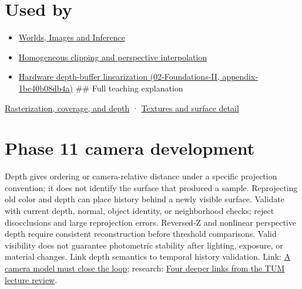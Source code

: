 \section{Used by}\label{appendix-97578ed97952-used-by}

\begin{itemize}
\item
  \href{Continuous\%20Notes/University\%20-\%20Worlds,\%20Images\%20and\%20Inference\%20-\%20Graphics,\%20Vision\%20and\%20Photography}{Worlds, Images and Inference}
\item
  \hyperref[appendix-40426e4b2103]{Homogeneous clipping and perspective interpolation}
\item
  \href{../02-Foundations-II/main.pdf\#nameddest=appendix-1bc40b08db4a}{Hardware depth-buffer linearization (02-Foundations-II, appendix-1bc40b08db4a)} \#\# Full teaching explanation
\end{itemize}

\href{Continuous\%20Notes/University\%20-\%20Worlds,\%20Images\%20and\%20Inference\%20-\%20Graphics,\%20Vision\%20and\%20Photography\#Rasterization,\%20coverage,\%20and\%20depth}{Rasterization, coverage, and depth} · \href{Continuous\%20Notes/University\%20-\%20Worlds,\%20Images\%20and\%20Inference\%20-\%20Graphics,\%20Vision\%20and\%20Photography\#Textures\%20and\%20surface\%20detail}{Textures and surface detail}

\section{Phase 11 camera development}\label{appendix-97578ed97952-phase-11-camera-development}

Depth gives ordering or camera-relative distance under a specific projection convention; it does not identify the surface that produced a sample. Reprojecting old color and depth can place history behind a newly visible surface. Validate with current depth, normal, object identity, or neighborhood checks; reject disocclusions and large reprojection errors. Reversed-Z and nonlinear perspective depth require consistent reconstruction before threshold comparisons. Valid visibility does not guarantee photometric stability after lighting, exposure, or material changes. Link depth semantics to temporal history validation. Link: \href{Continuous\%20Notes/Computing\%20Foundations\%20-\%20From\%20Bits\%20to\%20C++\%20and\%20Systems\%20APIs\#A\%20camera\%20model\%20must\%20close\%20the\%20loop}{A camera model must close the loop}; research: \href{Continuous\%20Notes/Computing\%20Foundations\%20-\%20From\%20Bits\%20to\%20C++\%20and\%20Systems\%20APIs\#Four\%20deeper\%20links\%20from\%20the\%20TUM\%20lecture\%20review}{Four deeper links from the TUM lecture review}.
